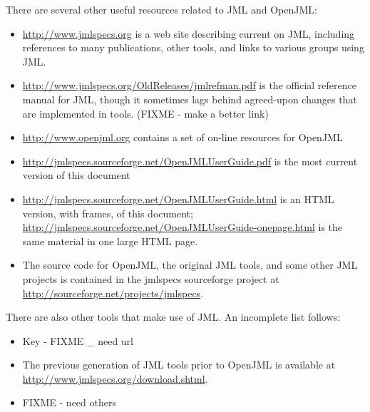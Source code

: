 There are several other useful resources related to JML and OpenJML:
\begin{itemize}
\item \url{http://www.jmlspecs.org} is a web site describing current on JML, including references to many publications, other tools, and links to various groups using JML.
\item \url{http://www.jmlspecs.org/OldReleases/jmlrefman.pdf} is the official reference manual for JML, though it sometimes lags behind agreed-upon changes that are implemented in tools. (FIXME - make a better link)
\item \url{http://www.openjml.org} contains a set of on-line resources for OpenJML
\item \url{http://jmlspecs.sourceforge.net/OpenJMLUserGuide.pdf} is the most current version of this document
\item \url{http://jmlspecs.sourceforge.net/OpenJMLUserGuide.html} is an HTML version, with frames, of this document; \url{http://jmlspecs.sourceforge.net/OpenJMLUserGuide-onepage.html} is the same material in one large HTML page.
\item The source code for OpenJML, the original JML tools, and some other JML projects is contained in the jmlspecs sourceforge project at \url{http://sourceforge.net/projects/jmlspecs}.
\end{itemize}

There are also other tools that make use of JML. An incomplete list follows:
\begin{itemize}
\item Key - FIXME _ need url
\item The previous generation of JML tools prior to OpenJML is available at \url{http://www.jmlspecs.org/download.shtml}.
\item FIXME - need others
\end{itemize}